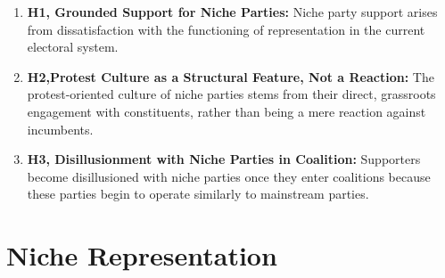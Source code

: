 \begin{enumerate}
	\item \textbf{H1, Grounded Support for Niche Parties:}
	      Niche party support arises from dissatisfaction with the functioning of representation in the current electoral system.

	\item \textbf{H2,Protest Culture as a Structural Feature, Not a Reaction:}
	      The protest-oriented culture of niche parties stems from their direct, grassroots engagement with constituents, rather than being a mere reaction against incumbents.

	\item \textbf{H3, Disillusionment with Niche Parties in Coalition:}
	      Supporters become disillusioned with niche parties once they enter coalitions because these parties begin to operate similarly to mainstream parties.
\end{enumerate}

%
%
%
\chapter{Niche Representation}\label{chap:Niche Representation} %

